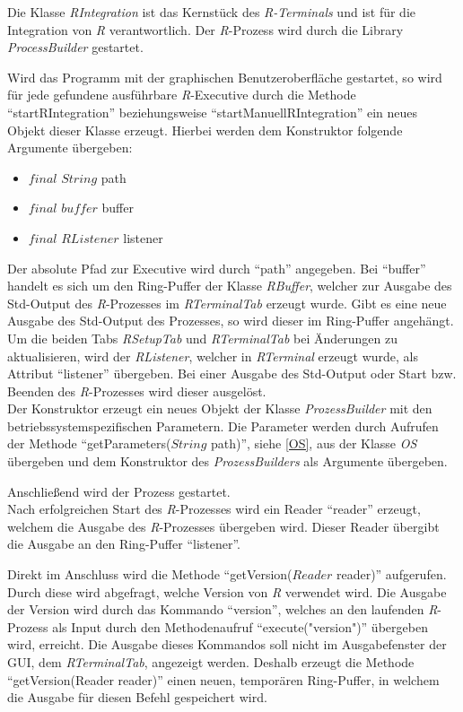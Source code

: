 \documentclass[a4paper, 12pt]{report} %
\begin{document}
Die Klasse \textit{RIntegration} ist das Kernstück des \textit{R-Terminals} und ist für die Integration von \textit{R} verantwortlich. Der \textit{R}-Prozess wird durch die Library \textit{ProcessBuilder} gestartet.

Wird das Programm mit der graphischen Benutzeroberfläche gestartet, so wird für jede gefundene ausführbare \textit{R}-Executive durch die Methode "`startRIntegration"' beziehungsweise "`startManuellRIntegration"' ein neues Objekt dieser Klasse erzeugt.
Hierbei werden dem Konstruktor folgende Argumente übergeben:
\begin{itemize}
	\item $final$ $String$ path
	\item $final$ $buffer$ buffer 
	\item $final$ $RListener$ listener
\end{itemize}
%
Der absolute Pfad zur Executive wird durch "`path"' angegeben. Bei "`buffer"' handelt es sich um den Ring-Puffer der Klasse \textit{RBuffer}, welcher zur Ausgabe des Std-Output des \textit{R}-Prozesses im \textit{RTerminalTab} erzeugt wurde. Gibt es eine neue Ausgabe des Std-Output des Prozesses, so wird dieser im Ring-Puffer angehängt. 
Um die beiden Tabs \textit{RSetupTab} und \textit{RTerminalTab} bei Änderungen zu aktualisieren, wird der \textit{RListener}, welcher in \textit{RTerminal} erzeugt wurde, als Attribut "`listener"' übergeben.
Bei einer Ausgabe des Std-Output oder Start bzw. Beenden des \textit{R}-Prozesses wird dieser ausgelöst.\\

Der Konstruktor erzeugt ein neues Objekt der Klasse \textit{ProzessBuilder} mit den betriebssystemspezifischen Parametern. Die Parameter werden durch Aufrufen der Methode "`getParameters($String$ path)"', siehe \ref{OS}, aus der Klasse \textit{OS} übergeben und dem Konstruktor des \textit{ProzessBuilders} als Argumente übergeben.

Anschließend wird der Prozess gestartet.\\

Nach erfolgreichen Start des \textit{R}-Prozesses wird ein Reader "`reader"' erzeugt, welchem die Ausgabe des \textit{R}-Prozesses übergeben wird. Dieser Reader übergibt die Ausgabe an den Ring-Puffer "`listener"'.

Direkt im Anschluss wird die Methode "`getVersion($Reader$ reader)"' aufgerufen. Durch diese wird abgefragt, welche Version von \textit{R} verwendet wird.
Die Ausgabe der Version wird durch das Kommando "`version"', welches an den laufenden \textit{R}-Prozess als Input durch den Methodenaufruf "`execute("version")"' übergeben wird, erreicht. Die Ausgabe dieses Kommandos soll nicht im Ausgabefenster der GUI, dem \textit{RTerminalTab}, angezeigt werden. Deshalb erzeugt die Methode "`getVersion(Reader reader)"' einen neuen, temporären Ring-Puffer, in welchem die Ausgabe für diesen Befehl gespeichert wird. 
\end{document}
